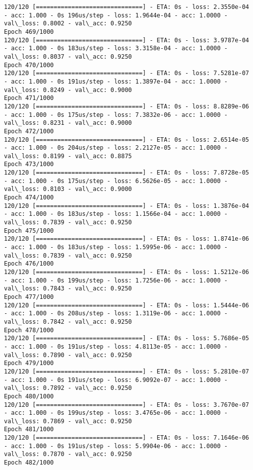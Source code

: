 \documentclass[11pt]{article}
\begin{document}
\begin{Verbatim}[commandchars=\\\{\}]
120/120 [==============================] - ETA: 0s - loss: 2.3550e-04 - acc: 1.000 - 0s 196us/step - loss: 1.9644e-04 - acc: 1.0000 - val\_loss: 0.8002 - val\_acc: 0.9250
Epoch 469/1000
120/120 [==============================] - ETA: 0s - loss: 3.9787e-04 - acc: 1.000 - 0s 183us/step - loss: 3.3158e-04 - acc: 1.0000 - val\_loss: 0.8037 - val\_acc: 0.9250
Epoch 470/1000
120/120 [==============================] - ETA: 0s - loss: 7.5281e-07 - acc: 1.000 - 0s 191us/step - loss: 1.3897e-04 - acc: 1.0000 - val\_loss: 0.8249 - val\_acc: 0.9000
Epoch 471/1000
120/120 [==============================] - ETA: 0s - loss: 8.8289e-06 - acc: 1.000 - 0s 175us/step - loss: 7.3832e-06 - acc: 1.0000 - val\_loss: 0.8231 - val\_acc: 0.9000
Epoch 472/1000
120/120 [==============================] - ETA: 0s - loss: 2.6514e-05 - acc: 1.000 - 0s 204us/step - loss: 2.2127e-05 - acc: 1.0000 - val\_loss: 0.8199 - val\_acc: 0.8875
Epoch 473/1000
120/120 [==============================] - ETA: 0s - loss: 7.8728e-05 - acc: 1.000 - 0s 175us/step - loss: 6.5626e-05 - acc: 1.0000 - val\_loss: 0.8103 - val\_acc: 0.9000
Epoch 474/1000
120/120 [==============================] - ETA: 0s - loss: 1.3876e-04 - acc: 1.000 - 0s 183us/step - loss: 1.1566e-04 - acc: 1.0000 - val\_loss: 0.7839 - val\_acc: 0.9250
Epoch 475/1000
120/120 [==============================] - ETA: 0s - loss: 1.8741e-06 - acc: 1.000 - 0s 183us/step - loss: 1.5995e-06 - acc: 1.0000 - val\_loss: 0.7839 - val\_acc: 0.9250
Epoch 476/1000
120/120 [==============================] - ETA: 0s - loss: 1.5212e-06 - acc: 1.000 - 0s 199us/step - loss: 1.7256e-06 - acc: 1.0000 - val\_loss: 0.7843 - val\_acc: 0.9250
Epoch 477/1000
120/120 [==============================] - ETA: 0s - loss: 1.5444e-06 - acc: 1.000 - 0s 208us/step - loss: 1.3119e-06 - acc: 1.0000 - val\_loss: 0.7842 - val\_acc: 0.9250
Epoch 478/1000
120/120 [==============================] - ETA: 0s - loss: 5.7686e-05 - acc: 1.000 - 0s 191us/step - loss: 4.8113e-05 - acc: 1.0000 - val\_loss: 0.7890 - val\_acc: 0.9250
Epoch 479/1000
120/120 [==============================] - ETA: 0s - loss: 5.2810e-07 - acc: 1.000 - 0s 191us/step - loss: 6.9092e-07 - acc: 1.0000 - val\_loss: 0.7892 - val\_acc: 0.9250
Epoch 480/1000
120/120 [==============================] - ETA: 0s - loss: 3.7670e-07 - acc: 1.000 - 0s 199us/step - loss: 3.4765e-06 - acc: 1.0000 - val\_loss: 0.7869 - val\_acc: 0.9250
Epoch 481/1000
120/120 [==============================] - ETA: 0s - loss: 7.1646e-06 - acc: 1.000 - 0s 191us/step - loss: 5.9904e-06 - acc: 1.0000 - val\_loss: 0.7870 - val\_acc: 0.9250
Epoch 482/1000

\end{Verbatim}
\end{document}
